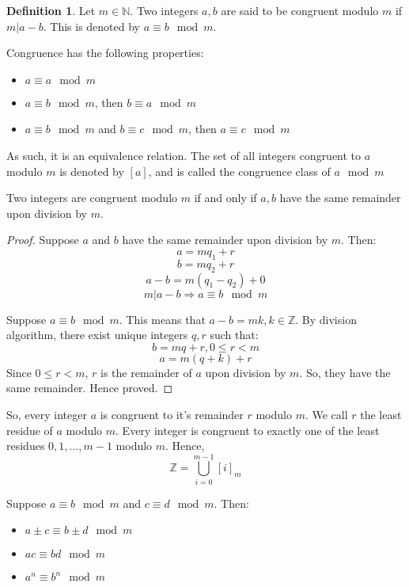 \documentclass[12pt,letterpaper]{book}
\theoremstyle{definition}
\newtheorem{definition}{Definition} %
\newcommand{\N}{\mathbb{N}}
\newcommand{\Z}{\mathbb{Z}}
\begin{document}
\begin{definition}
  Let $m \in \N$. Two integers $a,b$ are said to be congruent modulo $m$ if $m|a-b$. This is denoted by $a \equiv b \mod m$.
\end{definition}

Congruence has the following properties:

\begin{itemize}
  \item $a \equiv a \mod m$
  \item $a \equiv b \mod m$, then $b \equiv a \mod m$
  \item $a \equiv b \mod m$ and $b \equiv c \mod m$, then $a \equiv c \mod m$
\end{itemize}

As such, it is an equivalence relation. The set of all integers congruent to $a$ modulo $m$ is denoted by $[a]$, and is called the congruence class of $a \mod m$

\begin{lemma}
  Two integers are congruent modulo $m$ if and only if $a,b$ have the same remainder upon division by $m$.
\end{lemma}
\begin{proof}
Suppose $a$ and $b$ have the same remainder upon division by $m$. Then:
\[a = mq_1 + r\]
\[b = mq_2 + r\]
\[a-b = m(q_1-q_2) + 0\]
\[m|a-b \Rightarrow a \equiv b \mod m\]

Suppose $a \equiv b \mod m$. This means that $a-b = mk, k \in \Z$. By division algorithm, there exist unique integers $q,r$ such that:
\[b = mq+r, 0 \leq r < m\]
\[a = m(q+k) + r\]
Since $0 \leq r < m$, $r$ is the remainder of $a$ upon division by $m$. So, they have the same remainder. Hence proved.
\end{proof}

So, every integer $a$ is congruent to it's remainder $r$ modulo $m$. We call $r$ the least residue of $a$ modulo $m$. Every integer is congruent to exactly one of the least residues $0,1,...,m-1$ modulo $m$. Hence,
\[\Z = \bigcup_{i=0}^{m-1} [i]_m\]

\begin{lemma}
  Suppose $a \equiv b \mod m$ and $c \equiv d \mod m$. Then:
  \begin{itemize}
    \item $a \pm c \equiv b \pm d \mod m$
    \item $ac \equiv bd \mod m$
    \item $a^n \equiv b^n \mod m$
  \end{itemize}
\end{lemma}
\end{document}

